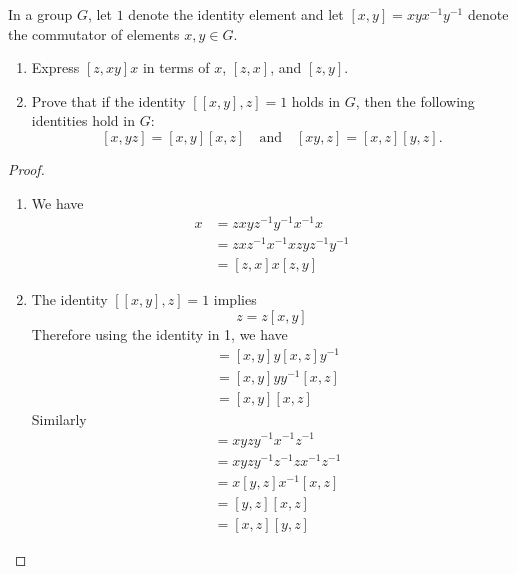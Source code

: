 \begin{prob}[F2003-Q1]
    In a group \( G \), let \( 1 \) denote the identity element and let \([x, y] = xyx^{-1}y^{-1}\) denote the commutator of elements \(x, y \in G\).
    
    \begin{enumerate}
        \item Express \([z, xy]x\) in terms of \(x\), \([z, x]\), and \([z, y]\).
        
        \item Prove that if the identity \([[x, y], z] = 1\) holds in \(G\), then the following identities hold in \(G\):
        \[
        [x, yz] = [x, y][x, z] \quad \text{and} \quad [xy, z] = [x, z][y, z].
        \]
    \end{enumerate}
\end{prob}
\begin{proof}
    \begin{enumerate}
        \item We have 
        \begin{align*}
            [z,xy]x&=zxyz^{-1}y^{-1}x^{-1}x\\
            &=zxz^{-1}x^{-1}xzyz^{-1}y^{-1}\\
            &=[z,x]x[z,y]
        \end{align*}
        \item The identity $[[x,y],z]=1$ implies 
        \begin{equation*}
            [x,y]z=z[x,y]
        \end{equation*}
        Therefore using the identity in 1, we have 
        \begin{align*}
            [x,yz]&=[x,y]y[x,z]y^{-1}\\
            &=[x,y]yy^{-1}[x,z]\\
            &=[x,y][x,z]
        \end{align*}
        Similarly
        \begin{align*}
            [xy,z]&=xyzy^{-1}x^{-1}z^{-1}\\
            &=xyzy^{-1}z^{-1}zx^{-1}z^{-1}\\
            &=x[y,z]x^{-1}[x,z]\\
            &=[y,z][x,z]\\
            &=[x,z][y,z]
        \end{align*}
    \end{enumerate}
\end{proof}

